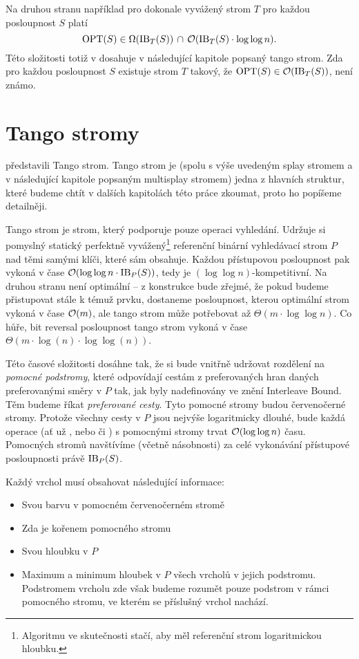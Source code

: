 Na druhou stranu například pro dokonale vyvážený strom $T$ pro každou posloupnost $S$ platí $$\operatorname{OPT}(S) \in \Omega(\operatorname{IB}_T(S))\, \cap\, \mathcal O(\operatorname{IB}_T(S)\cdot\log\log n).$$ Této složitosti totiž v dosahuje v následující kapitole popsaný tango strom.
Zda pro každou posloupnost $S$ existuje
strom $T$ takový, že $\operatorname{OPT}(S)\in\mathcal O(\operatorname{IB}_T(S))$, není známo.  

\section{Tango stromy}\label{sec:tango}

\citet{tango} představili Tango strom. Tango strom je (spolu s výše uvedeným
splay stromem a v následující kapitole popsaným multisplay stromem) jedna z
hlavních struktur, které budeme chtít v dalších kapitolách této práce zkoumat,
proto ho popíšeme detailněji.

Tango strom je strom, který podporuje pouze operaci vyhledání. Udržuje si
pomyslný statický perfektně vyvážený\footnote{Algoritmu ve skutečnosti stačí,
aby měl referenční strom logaritmickou hloubku.} referenční binární vyhledávací
strom $P$ nad těmi samými klíči, které sám obsahuje. Každou přístupovou
posloupnost pak vykoná v čase $\mathcal O(\log\log n\cdot \operatorname{IB}_P(S))$, tedy je
$(\log\log n)$-kompetitivní. Na druhou stranu není optimální -- z konstrukce
bude zřejmé, že pokud budeme přistupovat stále k témuž prvku, dostaneme posloupnost, kterou optimální strom
 vykoná v čase $\mathcal O(m)$, ale tango strom může potřebovat až
$\Theta(m\cdot\log\log n )$. Co hůře, bit reversal posloupnost tango strom vykoná v čase $\Theta(m\cdot\log(n)\cdot \log\log(n))$.

Této časové složitosti dosáhne tak, že si bude vnitřně udržovat rozdělení na
\emph{pomocné podstromy}, které odpovídají cestám z preferovaných hran daných
preferovanými směry v $P$ tak, jak byly nadefinovány ve znění Interleave Bound.
Těm budeme říkat \emph{preferované cesty}. Tyto pomocné stromy budou červenočerné stromy. Protože všechny cesty v $P$
jsou nejvýše logaritmicky dlouhé, bude každá operace (ať už , nebo 
či ) s pomocnými stromy trvat $\mathcal O(\log\log n)$ času. Pomocných stromů
navštívíme (včetně násobnosti) za celé vykonávání přístupové posloupnosti právě
$\operatorname{IB}_P(S)$.

Každý vrchol musí obsahovat následující informace:
\begin{itemize}
\item Svou barvu v pomocném červenočerném stromě
\item Zda je kořenem pomocného stromu
\item Svou hloubku v $P$
\item Maximum a minimum hloubek v $P$ všech vrcholů v jejich podstromu. Podstromem vrcholu zde však budeme rozumět pouze podstrom v rámci pomocného stromu, ve kterém se příslušný vrchol nachází.
\end{itemize}

